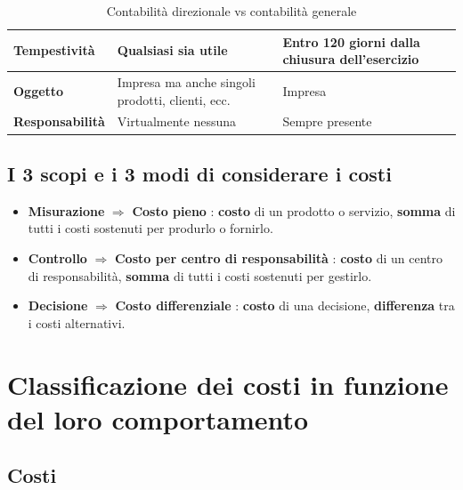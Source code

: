 \documentclass{article}
\begin{document}
\begin{table}[H]
{\begin{tabular}{|l|l|l|}
            \hline
            \textbf{Tempestività         } & Qualsiasi sia utile                                    & Entro 120 giorni dalla chiusura dell'esercizio            \\
            \hline
            \textbf{Oggetto              } & Impresa ma anche singoli prodotti, clienti, ecc.       & Impresa                                                   \\
            \hline
            \textbf{Responsabilità       } & Virtualmente nessuna                                   & Sempre presente                                           \\
            \hline
        \end{tabular}
    }
    \caption{Contabilità direzionale vs contabilità generale}
\end{table}
\subsection{I 3 scopi e i 3 modi di considerare i costi}
\begin{itemize}
    \item \textbf{Misurazione} $\Rightarrow$ \textbf{Costo pieno} : \textbf{costo} di un prodotto o servizio, \textbf{somma} di tutti i costi sostenuti per produrlo o fornirlo.
    \item \textbf{Controllo} $\Rightarrow$ \textbf{Costo per centro di responsabilità} : \textbf{costo} di un centro di responsabilità, \textbf{somma} di tutti i costi sostenuti per gestirlo.
    \item \textbf{Decisione} $\Rightarrow$ \textbf{Costo differenziale} : \textbf{costo} di una decisione, \textbf{differenza} tra i costi alternativi.
\end{itemize}
\newpage
\section{Classificazione dei costi in funzione del loro comportamento}
\subsection{Costi}
\end{document}
